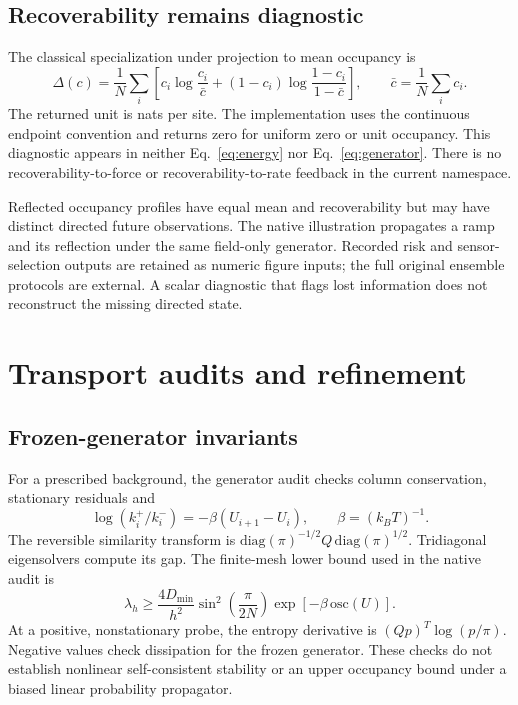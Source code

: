 \documentclass[11pt,a4paper]{article}
\begin{document}
\subsection{Recoverability remains diagnostic}

The classical specialization under projection to mean occupancy is
\begin{equation}
 \Delta(c)=\frac1N\sum_i\left[c_i\log\frac{c_i}{\bar c}
 +(1-c_i)\log\frac{1-c_i}{1-\bar c}\right],\qquad \bar c=\frac1N\sum_i c_i.
 \label{eq:recoverability}
\end{equation}
The returned unit is nats per site. The implementation uses the continuous endpoint convention and returns zero for uniform zero or unit occupancy. This diagnostic appears in neither Eq.~\eqref{eq:energy} nor Eq.~\eqref{eq:generator}. There is no recoverability-to-force or recoverability-to-rate feedback in the current namespace.

Reflected occupancy profiles have equal mean and recoverability but may have distinct directed future observations. The native illustration propagates a ramp and its reflection under the same field-only generator. Recorded risk and sensor-selection outputs are retained as numeric figure inputs; the full original ensemble protocols are external. A scalar diagnostic that flags lost information does not reconstruct the missing directed state.

\section{Transport audits and refinement}\label{sec:verification}

\subsection{Frozen-generator invariants}

For a prescribed background, the generator audit checks column conservation, stationary residuals and
\begin{equation}
 \log(k_i^+/k_i^-)=-\beta(U_{i+1}-U_i),\qquad\beta=(k_BT)^{-1}.
\end{equation}
The reversible similarity transform is
$\mathrm{diag}(\pi)^{-1/2}Q\,\mathrm{diag}(\pi)^{1/2}$.
Tridiagonal eigensolvers compute its gap. The finite-mesh lower bound used in the native audit is
\begin{equation}
 \lambda_h\geq\frac{4D_{\min}}{h^2}\sin^2\!\left(\frac{\pi}{2N}\right)
 \exp[-\beta\,\mathrm{osc}(U)].
\end{equation}
At a positive, nonstationary probe, the entropy derivative is $(Qp)^T\log(p/\pi)$. Negative values check dissipation for the frozen generator. These checks do not establish nonlinear self-consistent stability or an upper occupancy bound under a biased linear probability propagator.
\end{document}
